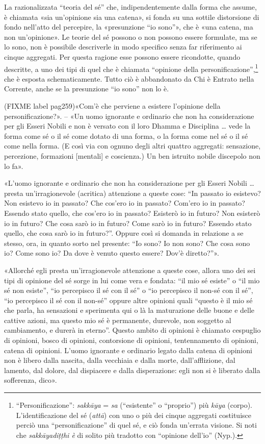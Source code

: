  La razionalizzata “teoria del sé” che,
indipendentemente dalla forma che assume, è chiamata «sia un’opinione
sia una catena», si fonda su una sottile distorsione di fondo nell’atto
del percepire, la «presunzione “io sono”», che è «una catena, ma non
un’opinione». Le teorie del sé possono o non possono essere formulate,
ma se lo sono, non è possibile descriverle in modo specifico senza far
riferimento ai cinque aggregati. Per questa ragione esse possono essere
ricondotte, quando descritte, a uno dei tipi di quel che è chiamata
“opinione della personificazione”,\footnote{“Personificazione”: \emph{sakkāya} = \emph{sa} (“esistente” o “proprio”) più \emph{kāya} (corpo). L’identificazione del sé (\emph{attā}) con uno o più dei cinque aggregati costituisce perciò una “personificazione” di quel sé, e ciò fonda un’errata visione. Si noti che \emph{sakkāyadiṭṭhi è} di solito più tradotto con “opinione dell’io” (Nyp.).} che è esposta
schematicamente. Tutto ciò è abbandonato da Chi è Entrato nella
Corrente, anche se la presunzione “io sono” non lo è.


 (FIXME label pag259)«Com’è che perviene a esistere l’opinione della
personificazione?». – «Un uomo ignorante e ordinario che non ha
considerazione per gli Esseri Nobili e non è versato con il loro Dhamma
e Disciplina … vede la forma come sé o il sé come dotato di una forma, o
la forma come nel sé o il sé come nella forma. (E così via con ognuno
degli altri quattro aggregati: sensazione, percezione, formazioni
[mentali] e coscienza.) Un ben istruito nobile discepolo non lo fa».




«L’uomo ignorante e ordinario che non ha considerazione per gli Esseri
Nobili … presta un’irragionevole (acritica) attenzione a queste cose:
“In passato io esistevo? Non esistevo io in passato? Che cos’ero io in
passato? Com’ero io in passato? Essendo stato quello, che cos’ero io in
passato? Esisterò io in futuro? Non esisterò io in futuro? Che cosa sarò
io in futuro? Come sarò io in futuro? Essendo stato quello, che cosa
sarò io in futuro?”. Oppure così si domanda in relazione a se stesso,
ora, in quanto sorto nel presente: “Io sono? Io non sono? Che cosa sono
io? Come sono io? Da dove è venuto questo essere? Dov’è diretto?”».


«Allorché egli presta un’irragionevole attenzione a queste cose, allora
uno dei sei tipi di opinione del sé sorge in lui come vera e fondata:
“il mio sé esiste” o “il mio sé non esiste”, “io percepisco il sé con il
sé” o “io percepisco il non-sé con il sé”, “io percepisco il sé con il
non-sé” oppure altre opinioni quali “questo è il mio sé che parla, ha
sensazioni e sperimenta qui o là la maturazione delle buone e delle
cattive azioni, ma questo mio sé è permanente, durevole, non soggetto al
cambiamento, e durerà in eterno”. Questo ambito di opinioni è chiamato
cespuglio di opinioni, bosco di opinioni, contorsione di opinioni,
tentennamento di opinioni, catena di opinioni. L’uomo ignorante e
ordinario legato dalla catena di opinioni non è libero dalla nascita,
dalla vecchiaia e dalla morte, dall’afflizione, dal lamento, dal dolore,
dal dispiacere e dalla disperazione: egli non si è liberato dalla
sofferenza, dico».


